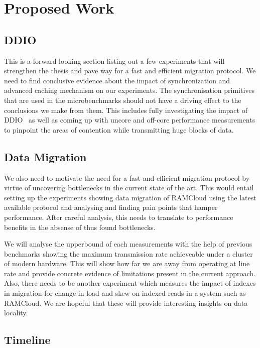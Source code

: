 
\chapter{Proposed Work}


\section{DDIO}
This is a forward looking section listing out a few experiments that will
strengthen the thesis and pave way for a fast and efficient migration protocol.
We need to find conclusive evidence about the impact of synchronization and 
advanced caching mechanism on our experiments. The synchronisation primitives 
that are used in the microbenchmarks should not have a driving effect to the 
conclusions we make from them. This includes fully investigating the impact
of DDIO~\cite{ddio} as well as coming up with uncore and off-core performance
measurements to pinpoint the areas of contention while transmitting huge blocks
of data.

\section{Data Migration}
We also need to motivate the need for a fast and efficient migration protocol 
by virtue of uncovering bottlenecks in the current state of the art. This would entail
setting up the experiments showing data migration of RAMCloud using the latest 
available protocol and analysing and finding pain points that hamper performance.
After careful analysis, this needs to translate to performance benefits in the absense
of thus found bottlenecks. 

We will analyse the upperbound of each measurements with the help
of previous benchmarks showing the maximum transmission rate achieveable under 
a cluster of modern hardware. This will show how far we are away from 
operating at line rate and provide concrete evidence of limitations present in 
the current approach. Also, there needs to be another experiment which measures
the impact of indexes in migration for change in load and skew on indexed reads
in a system such as RAMCloud. We are hopeful that these will provide interesting
insights on data locality.

\section{Timeline}

